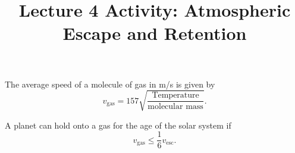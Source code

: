 \documentclass{article}
\title{Lecture 4 Activity: Atmospheric Escape and Retention}
\begin{document}
\maketitle
The average speed of a molecule of gas in m/s is given by \[
	v_{\text{gas}}=157\sqrt{\frac{\text{Temperature}}{\text{molecular mass}}}
	.\]

A planet can hold onto a gas for the age of the solar system if \[
	v_{\text{gas}}\le \frac{1}{6}v_{\text{esc}}
	.\]











\end{document}
